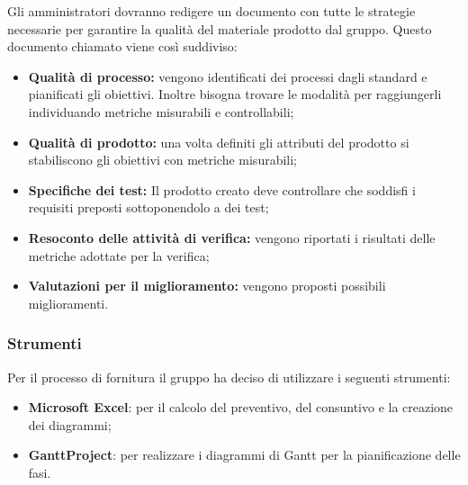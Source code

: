 \myparagraph{\PdQ} 
Gli amministratori dovranno redigere un documento con tutte le strategie necessarie per garantire la qualità del materiale prodotto dal gruppo. Questo documento chiamato \PdQv{}viene così suddiviso:
\begin{itemize}
    \item \textbf{Qualità di processo:} vengono identificati dei processi dagli standard e pianificati gli obiettivi. Inoltre bisogna trovare le modalità per raggiungerli individuando metriche misurabili e controllabili;    
    \item \textbf{Qualità di prodotto:} una volta definiti gli attributi del prodotto si stabiliscono gli obiettivi con metriche misurabili;    
    \item \textbf{Specifiche dei test:} Il prodotto creato deve controllare che soddisfi i requisiti preposti sottoponendolo a dei test;
	\item \textbf{Resoconto delle attività di verifica:} vengono riportati i risultati delle metriche adottate per la verifica;
    \item \textbf{Valutazioni per il miglioramento:} vengono proposti possibili miglioramenti.
\end{itemize}

\subsubsection{Strumenti}
Per il processo di fornitura il gruppo ha deciso di utilizzare i seguenti strumenti:
\begin{itemize}
    \item \textbf{Microsoft Excel}: per il calcolo del preventivo, del consuntivo e la creazione dei diagrammi;
    \item \textbf{GanttProject}: per realizzare i diagrammi di Gantt per la pianificazione delle fasi.
\end{itemize}